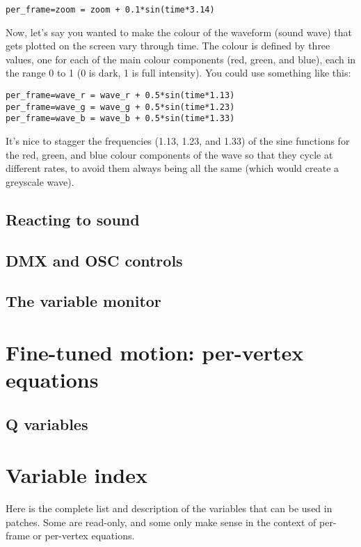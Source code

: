 \documentclass[11pt, a5paper, pagesize]{scrbook}
\begin{document}
\begin{verbatim}
per_frame=zoom = zoom + 0.1*sin(time*3.14)
\end{verbatim}

Now, let's say you wanted to make the colour of the waveform (sound wave) that gets plotted on the screen vary through time. The colour is defined by three values, one for each of the main colour components (red, green, and blue), each in the range 0 to 1 (0 is dark, 1 is full intensity). You could use something like this:

\begin{verbatim}
per_frame=wave_r = wave_r + 0.5*sin(time*1.13)
per_frame=wave_g = wave_g + 0.5*sin(time*1.23)
per_frame=wave_b = wave_b + 0.5*sin(time*1.33)
\end{verbatim}

It's nice to stagger the frequencies (1.13, 1.23, and 1.33) of the sine functions for the red, green, and blue colour components of the wave so that they cycle at different rates, to avoid them always being all the same (which would create a greyscale wave).

\subsection{Reacting to sound}

\subsection{DMX and OSC controls}

\subsection{The variable monitor}

\section{Fine-tuned motion: per-vertex equations}

\subsection{Q variables}


\section{Variable index}
Here is the complete list and description of the variables that can be used in patches. Some are read-only, and some only make sense in the context of per-frame or per-vertex equations.
\end{document}
